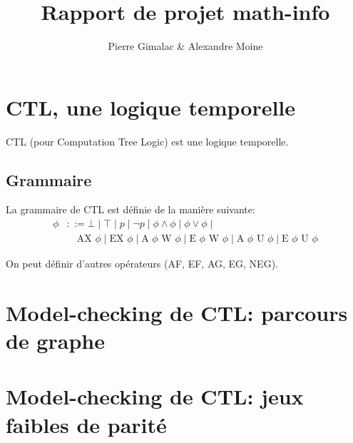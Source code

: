 \documentclass[10pt,a4paper]{article}
\author{Pierre Gimalac \& Alexandre Moine}
\title{Rapport de projet math-info}
\begin{document}
\maketitle

\section{CTL, une logique temporelle}
CTL (pour Computation Tree Logic) est une logique temporelle.

\subsection{Grammaire}
La grammaire de CTL est définie de la manière suivante:
\begin{align*}
\phi &::= \bot \mid \top \mid p \mid \neg p \mid \phi\land\phi \mid \phi\lor\phi \mid \\
&\quad \mbox{AX }\phi \mid \mbox{EX }\phi \mid
\mbox{A }\phi \mbox{ W } \phi \mid \mbox{E }\phi \mbox{ W } \phi \mid
\mbox{A }\phi \mbox{ U } \phi \mid \mbox{E }\phi \mbox{ U } \phi
\end{align*}

On peut définir d'autres opérateurs (AF, EF, AG, EG, NEG).

\section{Model-checking de CTL: parcours de graphe}

\section{Model-checking de CTL: jeux faibles de parité}
\end{document}
